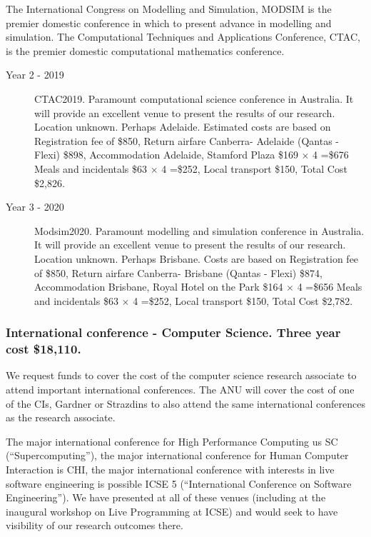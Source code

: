\documentclass[a4paper,twoside,12pt,compact]{article}
\begin{document}
The International Congress on Modelling and Simulation, MODSIM is the premier domestic conference in which to present advance in modelling and simulation. 
The Computational Techniques and Applications Conference, CTAC, is the premier domestic computational mathematics conference.

\begin{description}




\item[Year 2 - 2019] CTAC2019.
Paramount computational science conference in Australia. It will provide an excellent venue to present the results of our research. Location unknown. Perhaps Adelaide.
Estimated costs are based on 
Registration fee of \$850, 
Return airfare Canberra- Adelaide (Qantas - Flexi) \$898,
Accommodation Adelaide, Stamford Plaza \$169 $\times$ 4 =\$676
Meals and incidentals \$63 $\times$ 4 =\$252, Local transport \$150, 
Total Cost \$2,826.




\item[Year 3 - 2020] Modsim2020.
Paramount modelling and simulation conference in Australia. It will provide an excellent venue to present the results of our research. Location unknown. Perhaps Brisbane.
Costs are based on 
Registration fee of \$850, 
Return airfare Canberra- Brisbane (Qantas - Flexi) \$874,
Accommodation Brisbane, Royal Hotel on the Park \$164 $\times$ 4 =\$656
Meals and incidentals \$63 $\times$ 4 =\$252, Local transport \$150, 
Total Cost \$2,782.




\end{description}

\subsubsection*{International conference - Computer Science. Three year cost \$18,110.}


We request funds to cover the cost of the computer science research associate to attend important international conferences.    
The ANU will cover the cost of one of the CIs, Gardner or Strazdins to also attend the same international conferences as the research associate. 

The major international conference for High Performance Computing us SC (``Supercomputing''), the major international conference for Human Computer Interaction is CHI, the major international conference with interests in live software engineering is possible ICSE 5 (``International Conference on Software Engineering''). We have presented at all of these venues (including at the inaugural workshop on Live Programming at ICSE) and would seek to have visibility of our research outcomes there. 
\end{document}
